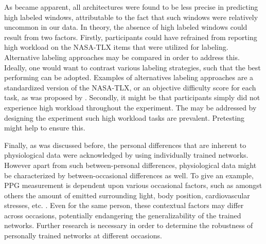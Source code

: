 \documentclass[fleqn,11pt]{paper}
\begin{document}
As became apparent, all architectures were found to be less precise in predicting high labeled windows, attributable to the fact that such windows were relatively uncommon in our data. In theory, the absence of high labeled windows could result from two factors. Firstly, participants could have refrained from reporting high workload on the NASA-TLX items that were utilized for labeling. Alternative labeling approaches may be compared in order to address this. Ideally, one would want to contrast various labeling strategies, such that the best performing can be adopted. Examples of alternatives labeling approaches are a standardized version of the NASA-TLX, or an objective difficulty score for each task, as was proposed by . Secondly, it might be that participants simply did not experience high workload throughout the experiment. The may be addressed by designing the experiment such high workload tasks are prevalent. Pretesting might help to ensure this.

Finally, as was discussed before, the personal differences that are inherent to physiological data were acknowledged by using individually trained networks. However apart from such between-personal differences, physiological data might be characterized by between-occasional differences as well. To give an example, PPG measurement is dependent upon various occasional factors, such as amongst others the amount of emitted surrounding light, body position, cardiovascular stresses, etc. \cite{lemay2014application}. Even for the same person, these contextual factors may differ across occasions, potentially endangering the generalizability of the trained networks. Further research is necessary in order to determine the robustness of personally trained networks at different occasions.
\end{document}
